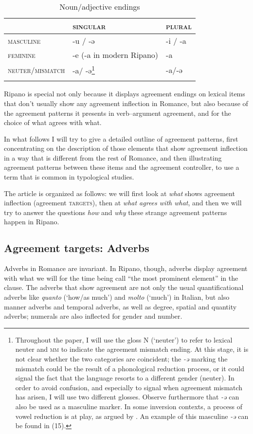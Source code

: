 \documentclass[output=paper
,modfonts
,nonflat]{langsci/langscibook}
\begin{document}
	\begin{table}
		\caption{Noun/adjective endings}
		\label{tab-dalessandro:2}
		\begin{tabular}{lll}
			\lsptoprule
			 & \textsc{singular} & \textsc{plural}\\
			\midrule
			\textsc{masculine} & -u / -ə & -i / -a\\
			\textsc{feminine} & -e (-a in modern Ripano) & -a\\
			\textsc{neuter/mismatch} & -a/ -ə\footnote{Throughout the paper, I will use the gloss N (‘neuter’) to refer to lexical neuter and \textsc{mm}  to indicate the agreement mismatch ending. At this stage, it is not clear whether the two categories are coincident; the \textit{-ə} marking the mismatch could be the result of a phonological reduction process, or it could signal the fact that the language resorts to a different gender (neuter). In order to avoid confusion, and especially to signal when agreement mismatch has arisen, I will use two different glosses. 
Observe furthermore that \textit{-ə} can also be used as a masculine marker. In some inversion contexts, a process of vowel reduction is at play, as argued by \citet{Paciaroni2017}. An example of this masculine \textit{-ə} can be found in (15).} & -a/-ə\\
			\lspbottomrule
		\end{tabular}
	\end{table}

Ripano is special not only because it displays agreement endings on lexical items that don’t usually show any agreement inflection in Romance, but also because of the agreement patterns it presents in verb--argument agreement, and for the choice of what agrees with what.

In what follows I will try to give a detailed outline of agreement patterns, first concentrating on the description of those elements that show agreement inflection in a way that is different from the rest of Romance, and then illustrating agreement patterns between these items and the agreement controller, to use a term that is common in typological studies.

The article is organized as follows: we will first look at \textit{what} shows agreement inflection (agreement \textsc{targets}), then at \textit{what agrees with what}, and then we will try to answer the questions \textit{how} and \textit{why} these strange agreement patterns happen in Ripano. 

\subsection{Agreement targets: Adverbs} \label{sec-dalessandro:1.2}
Adverbs in Romance are invariant. In Ripano, though, adverbs display agreement with what we will for the time being call “the most prominent element” in the clause. The adverbs that show agreement are not only the usual quantificational adverbs like \textit{quanto} (‘how/as much’) and \textit{molto} (‘much’) in Italian, but also manner adverbs and temporal adverbs, as well as degree, spatial and quantity adverbs; numerals are also inflected for gender and number.
\end{document}
